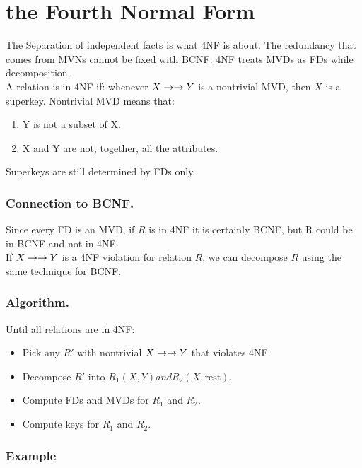 \documentclass[11pt,a4paper,twocolumn]{book}
\begin{document}
\section{the Fourth Normal Form}

The Separation of independent facts is what 4NF is about. The redundancy that comes from MVNs cannot be fixed with BCNF. 4NF treats MVDs as FDs while decomposition.\\

A relation is in 4NF if: whenever $X \to\to Y$ is a nontrivial MVD, then $X$ is a superkey. Nontrivial MVD means that:

\begin{enumerate}
\item Y is not a subset of X.
\item X and Y are not, together, all the attributes.
\end{enumerate}

Superkeys are still determined by FDs only.\\

\subsubsection{Connection to BCNF.}

Since every FD is an MVD, if $R$ is in 4NF it is certainly BCNF, but R could be in BCNF and not in 4NF.\\

If $X \to\to Y$ is a 4NF violation for relation $R$, we can decompose $R$ using the same technique for BCNF.

\subsubsection{Algorithm.}

Until all relations are in 4NF:

\begin{itemize}
\item Pick any $R'$ with nontrivial $X \to\to Y$ that violates 4NF.
\item Decompose $R'$ into $R_1(X, Y) and R_2(X, \text{rest})$.
\item Compute FDs and MVDs for $R_1$ and $R_2$.
\item Compute keys for $R_1$ and $R_2$. 
\end{itemize}

\subsubsection{Example}
\end{document}
